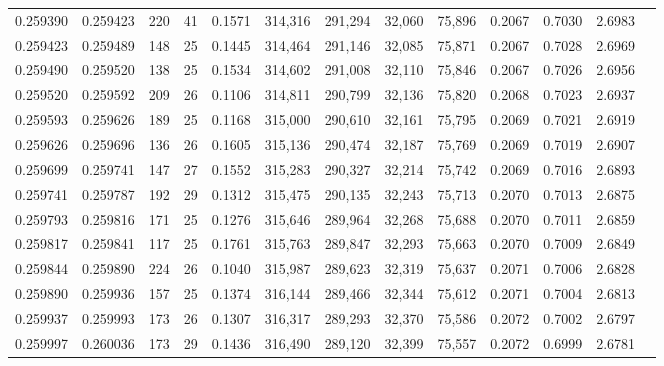 \begin{tabular}{rrrrrrrrrrrrr}
0.259390 & 0.259423 &   220 &  41 &                                     0.1571 & 314,316 & 291,294 &  32,060 &  75,896 & 0.2067 & 0.7030 & 2.6983 \\
0.259423 & 0.259489 &   148 &  25 &                                     0.1445 & 314,464 & 291,146 &  32,085 &  75,871 & 0.2067 & 0.7028 & 2.6969 \\
0.259490 & 0.259520 &   138 &  25 &                                     0.1534 & 314,602 & 291,008 &  32,110 &  75,846 & 0.2067 & 0.7026 & 2.6956 \\
0.259520 & 0.259592 &   209 &  26 &                                     0.1106 & 314,811 & 290,799 &  32,136 &  75,820 & 0.2068 & 0.7023 & 2.6937 \\
0.259593 & 0.259626 &   189 &  25 &                                     0.1168 & 315,000 & 290,610 &  32,161 &  75,795 & 0.2069 & 0.7021 & 2.6919 \\
0.259626 & 0.259696 &   136 &  26 &                                     0.1605 & 315,136 & 290,474 &  32,187 &  75,769 & 0.2069 & 0.7019 & 2.6907 \\
0.259699 & 0.259741 &   147 &  27 &                                     0.1552 & 315,283 & 290,327 &  32,214 &  75,742 & 0.2069 & 0.7016 & 2.6893 \\
0.259741 & 0.259787 &   192 &  29 &                                     0.1312 & 315,475 & 290,135 &  32,243 &  75,713 & 0.2070 & 0.7013 & 2.6875 \\
0.259793 & 0.259816 &   171 &  25 &                                     0.1276 & 315,646 & 289,964 &  32,268 &  75,688 & 0.2070 & 0.7011 & 2.6859 \\
0.259817 & 0.259841 &   117 &  25 &                                     0.1761 & 315,763 & 289,847 &  32,293 &  75,663 & 0.2070 & 0.7009 & 2.6849 \\
0.259844 & 0.259890 &   224 &  26 &                                     0.1040 & 315,987 & 289,623 &  32,319 &  75,637 & 0.2071 & 0.7006 & 2.6828 \\
0.259890 & 0.259936 &   157 &  25 &                                     0.1374 & 316,144 & 289,466 &  32,344 &  75,612 & 0.2071 & 0.7004 & 2.6813 \\
0.259937 & 0.259993 &   173 &  26 &                                     0.1307 & 316,317 & 289,293 &  32,370 &  75,586 & 0.2072 & 0.7002 & 2.6797 \\
0.259997 & 0.260036 &   173 &  29 &                                     0.1436 & 316,490 & 289,120 &  32,399 &  75,557 & 0.2072 & 0.6999 & 2.6781 \\

\end{tabular}

